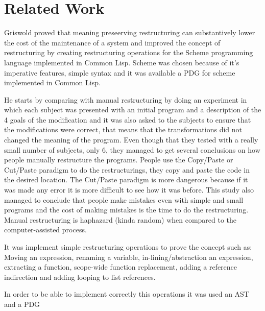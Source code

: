 
% 
% 

\section{Related Work}


Griswold \cite{griswold1991program} proved that meaning preseerving restructuring can substantively lower the cost of the maintenance of a system and improved the concept of restructuring by creating restructuring operations for the Scheme programming language implemented in Common Lisp. Scheme was chosen because of it's imperative features, simple syntax and it was available a PDG for scheme implemented in Common Lisp.


He starts by comparing with manual restructuring by doing an experiment in which each subject was presented with an initial program and a description of the 4 goals of the modification and it was also asked to the subjects to ensure that the modifications were correct, that means that the transformations did not changed the meaning of the program. Even though that they tested with a really small number of subjects, only 6, they managed to get several conclusions on how people manually restructure the programs.
People use the Copy/Paste or Cut/Paste paradigm to do the restructurings, they copy and paste the code in the desired location.
The Cut/Paste paradigm is more dangerous because if it was made any error it is more difficult to see how it was before. 
This study also managed to conclude that people make mistakes even with simple and small programs and the cost of making mistakes is the time to do the restructuring.
Manual restructuring is haphazard (kinda random) when compared to the computer-assisted process.


It was implement simple restructuring operations to prove the concept such as: Moving an expression, renaming a variable, in-lining/abstraction an expression, extracting a function, scope-wide function replacement, adding a reference indirection and adding looping to list references.


In order to be able to implement correctly this operations it was used an AST and a PDG







